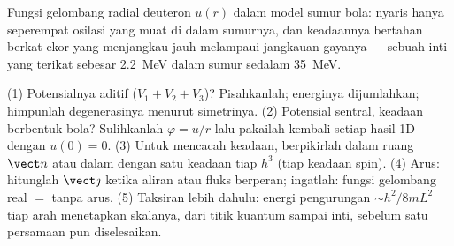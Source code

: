 \begin{omfigure}

{\small Fungsi gelombang radial deuteron $u(r)$ dalam model sumur bola:
nyaris hanya seperempat osilasi yang muat di dalam sumurnya, dan
keadaannya bertahan berkat ekor yang menjangkau jauh melampaui jangkauan
gayanya --- sebuah inti yang terikat sebesar \qty{2.2}{MeV} dalam sumur
sedalam \qty{35}{MeV}.}
\end{omfigure}

\begin{method}\label{met:b3:schrodinger-three-dimensions:method}
(1) Potensialnya aditif ($V_1 + V_2 + V_3$)? Pisahkanlah; energinya
dijumlahkan; himpunlah degenerasinya menurut simetrinya. (2) Potensial
sentral, keadaan berbentuk bola? Sulihkanlah $\varphi = u/r$ lalu
pakailah kembali setiap hasil 1D dengan $u(0) = 0$. (3) Untuk mencacah
keadaan, berpikirlah dalam ruang $\vect n$ atau dalam  dengan
satu keadaan tiap $h^3$ (tiap keadaan spin). (4) Arus: hitunglah
$\vect\jmath$ ketika aliran atau fluks berperan; ingatlah: fungsi
gelombang real $=$ tanpa arus. (5) Taksiran lebih dahulu: energi
pengurungan $\sim h^2/8mL^2$ tiap arah menetapkan skalanya, dari titik
kuantum sampai inti, sebelum satu persamaan pun diselesaikan.
\end{method}

